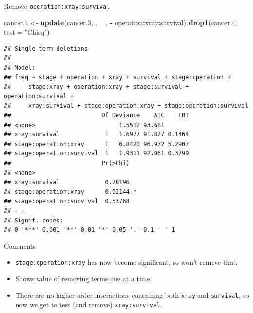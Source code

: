 \documentclass[ignorenonframetext,]{beamer}
\newenvironment{Shaded}{\begin{snugshade}}{\end{snugshade}}
\newcommand{\DataTypeTok}[1]{\textcolor[rgb]{0.13,0.29,0.53}{#1}}
\newcommand{\FloatTok}[1]{\textcolor[rgb]{0.00,0.00,0.81}{#1}}
\newcommand{\KeywordTok}[1]{\textcolor[rgb]{0.13,0.29,0.53}{\textbf{#1}}}
\newcommand{\NormalTok}[1]{#1}
\newcommand{\OperatorTok}[1]{\textcolor[rgb]{0.81,0.36,0.00}{\textbf{#1}}}
\newcommand{\StringTok}[1]{\textcolor[rgb]{0.31,0.60,0.02}{#1}}
\begin{document}
\begin{frame}[fragile]{Remove \texttt{operation:xray:survival}}
\protect\hypertarget{remove-operationxraysurvival}{}

\begin{Shaded}
\begin{Highlighting}[]
\NormalTok{cancer}\FloatTok{.4}\NormalTok{ <-}\StringTok{ }\KeywordTok{update}\NormalTok{(cancer}\FloatTok{.3}\NormalTok{, . }\OperatorTok{~}\StringTok{ }\NormalTok{. }\OperatorTok{-}\StringTok{ }\NormalTok{operation}\OperatorTok{:}\NormalTok{xray}\OperatorTok{:}\NormalTok{survival)}
\KeywordTok{drop1}\NormalTok{(cancer}\FloatTok{.4}\NormalTok{, }\DataTypeTok{test =} \StringTok{"Chisq"}\NormalTok{)}
\end{Highlighting}
\end{Shaded}

\begin{verbatim}
## Single term deletions
## 
## Model:
## freq ~ stage + operation + xray + survival + stage:operation + 
##     stage:xray + operation:xray + stage:survival + operation:survival + 
##     xray:survival + stage:operation:xray + stage:operation:survival
##                          Df Deviance    AIC    LRT
## <none>                        1.5512 93.681       
## xray:survival             1   1.6977 91.827 0.1464
## stage:operation:xray      1   6.8420 96.972 5.2907
## stage:operation:survival  1   1.9311 92.061 0.3799
##                          Pr(>Chi)  
## <none>                             
## xray:survival             0.70196  
## stage:operation:xray      0.02144 *
## stage:operation:survival  0.53768  
## ---
## Signif. codes:  
## 0 '***' 0.001 '**' 0.01 '*' 0.05 '.' 0.1 ' ' 1
\end{verbatim}

\end{frame}

\begin{frame}[fragile]{Comments}
\protect\hypertarget{comments-5}{}

\begin{itemize}
\item
  \texttt{stage:operation:xray} has now become significant, so won't
  remove that.
\item
  Shows value of removing terms one at a time.
\item
  There are no higher-order interactions containing both \texttt{xray}
  and \texttt{survival}, so now we get to test (and remove)
  \texttt{xray:survival}.
\end{itemize}

\end{frame}
\end{document}
